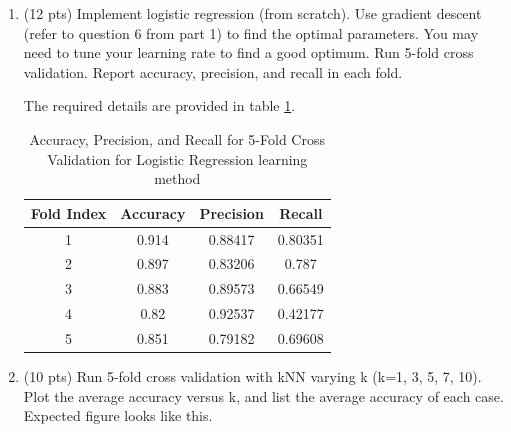 \documentclass[a4paper]{article}
\theoremstyle{definition}
\newenvironment{soln}{
    \leavevmode\color{blue}\ignorespaces
}{}
\begin{document}
\begin{enumerate}
	\item (12 pts) Implement logistic regression (from scratch). Use gradient descent (refer to question 6 from part 1) to find the optimal parameters. You may need to tune your learning rate to find a good optimum. Run 5-fold cross validation. Report accuracy, precision, and recall in each fold.
	
	\begin{soln}
    The required details are provided in table \ref{tab:2}.
    \begin{table}[H]
        \centering
        \begin{tabular}{|c|c|c|c|}
            \hline
            Fold Index & Accuracy & Precision & Recall \\
            \hline
            1 & 0.914 & 0.88417 & 0.80351 \\
            \hline
            2 & 0.897 & 0.83206 & 0.787 \\
            \hline
            3 & 0.883 & 0.89573 & 0.66549 \\
            \hline
            4 & 0.82 & 0.92537 & 0.42177 \\
            \hline
            5 & 0.851 & 0.79182 & 0.69608 \\
            \hline
        \end{tabular}
        \caption{Accuracy, Precision, and Recall for 5-Fold Cross Validation for Logistic Regression learning method}
        \label{tab:2}
    \end{table}
    \end{soln}
	
	\item (10 pts) Run 5-fold cross validation with kNN varying k (k=1, 3, 5, 7, 10). Plot the average accuracy versus k, and list the average accuracy of each case. \\
	Expected figure looks like this.
	

\end{enumerate}
\end{document}
